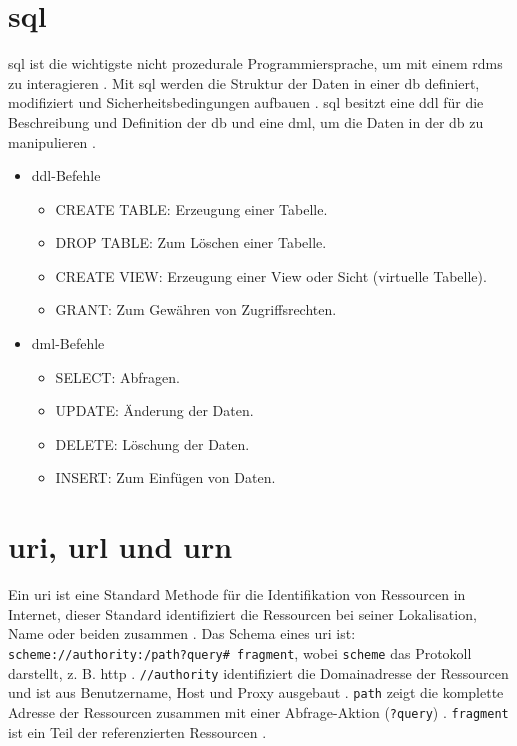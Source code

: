 \clearpage
\renewcommand{\cleardoublepage}{}
\renewcommand{\clearpage}{}

\chapter{\acs{sql}} \label{sec:sql}

\acf{sql} ist die wichtigste nicht prozedurale Programmiersprache, um mit einem \ac{rdms} zu interagieren \cite{sqlpost}. Mit \ac{sql} werden die Struktur der Daten in einer \ac{db} definiert, modifiziert und Sicherheitsbedingungen aufbauen \cite{dbsql}. \ac{sql} besitzt eine \ac{ddl} für die Beschreibung und Definition der \ac{db} und eine \ac{dml}, um die Daten in der \ac{db} zu manipulieren \cite{sqlpost, dbsql}.

\begin{itemize}
	\item \ac{ddl}-Befehle
	\begin{itemize}
		\item CREATE TABLE: Erzeugung einer Tabelle.
		\item DROP TABLE: Zum Löschen einer Tabelle.
		\item CREATE VIEW: Erzeugung einer View oder Sicht (virtuelle Tabelle).
		\item GRANT: Zum Gewähren von Zugriffsrechten.
	\end{itemize}
	\item \ac{dml}-Befehle
	\begin{itemize}
		\item SELECT: Abfragen.
		\item UPDATE: Änderung der Daten.
		\item DELETE: Löschung der Daten.
		\item INSERT: Zum Einfügen von Daten.
	\end{itemize}
\end{itemize}

\chapter{\acs{uri}, \acs{url} und \acs{urn}} \label{sec:uri}

Ein \acf{uri} ist eine Standard Methode für die Identifikation von Ressourcen in Internet, dieser Standard identifiziert die Ressourcen bei seiner Lokalisation, Name oder beiden zusammen \cite{uribibdiff}. Das Schema eines \ac{uri} ist: \texttt{scheme://authority:/path?query\# fragment}, wobei \texttt{scheme} das Protokoll darstellt, z. B. \glqq http\grqq{} \cite{uribibdiff, uribibdiff2}. \texttt{//authority} identifiziert die Domainadresse der Ressourcen und ist aus Benutzername, Host und Proxy ausgebaut \cite{uribibdiff, uribibdiff3}. \texttt{path} zeigt die komplette Adresse der Ressourcen zusammen mit einer Abfrage-Aktion (\texttt{?query}) \cite{uribibdiff2}. \texttt{fragment} ist ein Teil der referenzierten Ressourcen \cite{uribibdiff}.

